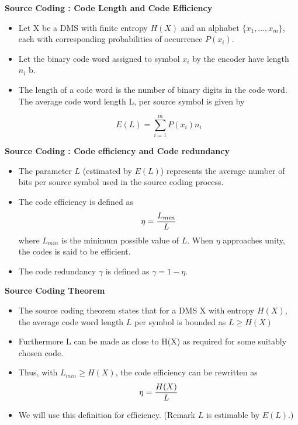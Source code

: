 \noindent \textbf{Source Coding : Code Length and Code Efficiency}
\begin{itemize}

\item
Let X be a DMS with finite entropy $H(X)$ and an alphabet $\{x_1 , \ldots,  x_m\}$, each with corresponding
probabilities of occurrence $P(x_i)$. \item Let the binary code word assigned to symbol $x_i$ by
the encoder have length $n_i$ b. \item The length of a code word is the number of binary digits
in the code word. The average code word length L, per source symbol is given by

\[ E(L) = \sum ^{m}_{i=1} P(x_i) n_i \]
\end{itemize}




\noindent \textbf{Source Coding : Code efficiency and Code redundancy}
\begin{itemize}
\item The parameter $L$ (estimated by $E(L)$) represents the average number of bits per source symbol used in the source coding process.\item
The code efficiency is defined as \[\eta = {L_{min} \over L} \]where $L_{min}$ is the minimum possible value of $L$. When $\eta$ approaches unity, the codes is said to be efficient.
\item The code redundancy $\gamma$ is defined as $\gamma = 1- \eta$.
\end{itemize}




\noindent \textbf{Source Coding Theorem}
\begin{itemize}
\item The source coding theorem states that for a DMS X with entropy $H(X)$, the average code word length $L$ per symbol is bounded as $L \geq H(X)$

\item Furthermore L can be made as close to H(X) as required for some suitably chosen code.
\item Thus, with $ L_{min} \geq H(X)$, the code efficiency can be rewritten as
\[\eta = {H(X) \over L} \]
\item We will use this definition for efficiency. (Remark $L$ is estimable by $E(L)$.)
\end{itemize}


